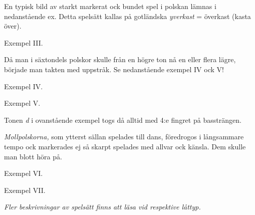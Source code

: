 {

\vspace{10mm}

En typisk bild av starkt markerat ock bundet spel i polskan lämnas i nedanstående ex.
Detta spelsätt kallas på gotländska \textit{\guillemotright{}yverkast\guillemotright{}}
= överkast (kasta över).

\vspace{5mm}

Exempel III.


\newpage

Då man i säxtondels polskor skulle från en högre ton nå en eller flera lägre,
började man takten med uppstråk. Se nedanstående exempel IV ock V!

\vspace{5mm}

Exempel IV.


\vspace{5mm}

Exempel V.


Tonen \textit{d} i ovanstående exempel togs då alltid med 4:e fingret på bassträngen.

\vspace{10mm}

\textit{Mollpolskorna,} som ytterst sällan spelades till dans,
föredrogos i långsammare tempo ock markerades ej så skarpt
\textemdash{} spelades med allvar ock känsla. Dem skulle man blott
\guillemotright{}höra på\guillemotright{}.

\vspace{5mm}

Exempel VI.


\vspace{5mm}

Exempel VII.


\vspace{15mm}

\textit{Fler beskrivningar av spelsätt finns att läsa vid respektive låttyp.}


}
\restoregeometry
\fancyhfoffset[E,O]{0pt}
\clearpage
\pagestyle{fancy}

